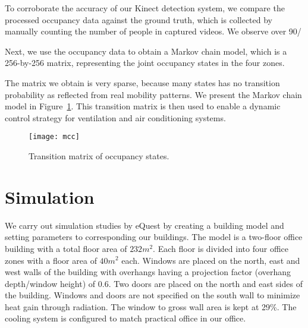 \documentclass{sig-alternate}
\begin{document}
To corroborate the accuracy of our Kinect detection system, we compare the processed occupancy data against the ground truth, which is collected by manually counting the number of people in captured videos.  We observe over 90/%

Next, we use the occupancy data to obtain a Markov chain model, which is a 256-by-256 matrix, representing the joint occupancy states in the four zones.


\par
The matrix we obtain is very sparse, because many states has no transition probability as reflected from real mobility patterns. We present the Markov chain model in Figure~\ref{fig:transitional-matrix}. This transition matrix is then used to enable a dynamic control strategy for ventilation and air conditioning systems. 



\begin{figure}[!tb]
  \centering
  \texttt{[image: mcc]}
  \caption{Transition matrix of occupancy states.}
  \label{fig:transitional-matrix}
\end{figure}



\section{Simulation}
\label{sec:simulation}

We carry out simulation studies by eQuest by creating a building model and setting parameters to corresponding our buildings. The model is a two-floor office building with a total floor area of $232m^{2}$. Each floor is divided into four office zones with a floor area of $40m^{2}$ each. Windows are placed on the north, east and west walls of the building with overhangs having a projection factor (overhang depth/window height) of $0.6$. Two doors are placed on the north and east sides of the building. Windows and doors are not specified on the south wall to minimize heat gain through radiation. The window to gross wall area is kept at 29\%. The cooling system  is configured to match practical office in our office. 
\end{document}
